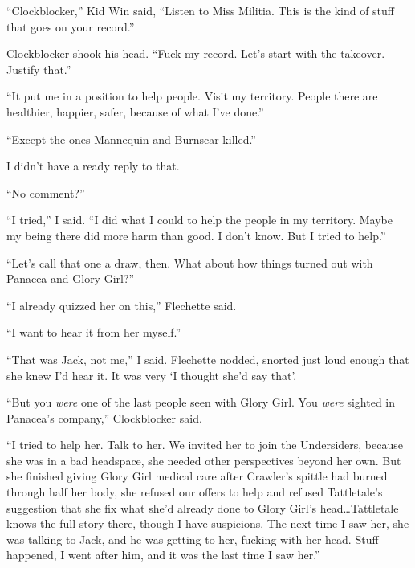``Clockblocker,'' Kid Win said, ``Listen to Miss Militia.  This is the kind of stuff that goes on your record.''



Clockblocker shook his head.  ``Fuck my record.  Let's start with the takeover.  Justify that.''



``It put me in a position to help people.  Visit my territory.  People there are healthier, happier, safer, because of what I've done.''



``Except the ones Mannequin and Burnscar killed.''



I didn't have a ready reply to that.



``No comment?''



``I tried,'' I said.  ``I did what I could to help the people in my territory.  Maybe my being there did more harm than good.  I don't know.  But I tried to help.''



``Let's call that one a draw, then.  What about how things turned out with Panacea and Glory Girl?''



``I already quizzed her on this,'' Flechette said.



``I want to hear it from her myself.''



``That was Jack, not me,'' I said.  Flechette nodded, snorted just loud enough that she knew I'd hear it.  It was very `I thought she'd say that'.



``But you \emph{were} one of the last people seen with Glory Girl.  You \emph{were} sighted in Panacea's company,'' Clockblocker said.



``I tried to help her.  Talk to her.  We invited her to join the Undersiders, because she was in a bad headspace, she needed other perspectives beyond her own.  But she finished giving Glory Girl medical care after Crawler's spittle had burned through half her body, she refused our offers to help and refused Tattletale's suggestion that she fix what she'd already done to Glory Girl's head\ldots Tattletale knows the full story there, though I have suspicions.  The next time I saw her, she was talking to Jack, and he was getting to her, fucking with her head.  Stuff happened, I went after him, and it was the last time I saw her.''



